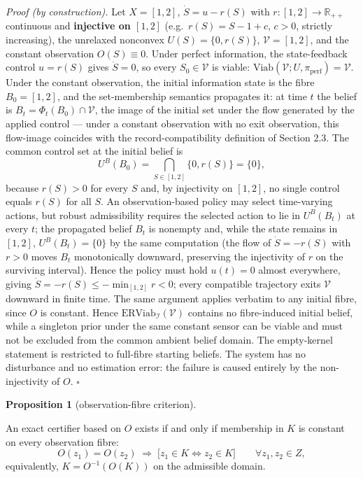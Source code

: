 \documentclass[11pt]{article}
\theoremstyle{definition}
\newtheorem{proposition}{Proposition}
\begin{document}
\emph{Proof (by construction).} Let \(X = [1,2]\), \(\dot S = u - r(S)\)
with \(r : [1,2] \to \mathbb{R}_{++}\) continuous and \textbf{injective
on \([1,2]\)} (e.g.~\(r(S) = S - 1 + c\), \(c > 0\), strictly
increasing), the unrelaxed nonconvex \(U(S) = \{0, r(S)\}\), \(\mathcal{V} = [1,2]\), and the
constant observation \(O(S) \equiv 0\). Under perfect information, the
state-feedback control \(u = r(S)\) gives \(\dot S = 0\), so every
\(S_0 \in \mathcal{V}\) is viable:
\(\mathrm{Viab}(\mathcal{V}; U, \pi_{\mathrm{perf}}) = \mathcal{V}\).
Under the constant observation, the initial information state is the
fibre \(B_0 = [1,2]\), and the set-membership semantics propagates it:
at time \(t\) the belief is \(B_t = \Phi_t(B_0) \cap \mathcal{V}\), the
image of the initial set under the flow generated by the applied control
--- under a constant observation with no exit observation, this
flow-image coincides with the record-compatibility definition of Section
2.3. The common control set at the initial belief is
\[U^B(B_0) = \bigcap_{S \in [1,2]} \{0, r(S)\} = \{0\},\] because
\(r(S) > 0\) for every \(S\) and, by injectivity on \([1,2]\), no single
control equals \(r(S)\) for all \(S\). An observation-based policy may
select time-varying actions, but robust admissibility requires the
selected action to lie in \(U^B(B_t)\) at every \(t\); the propagated
belief \(B_t\) is nonempty and, while the state remains in \([1,2]\),
\(U^B(B_t) = \{0\}\) by the same computation (the flow of
\(\dot S = -r(S)\) with \(r > 0\) moves \(B_t\) monotonically downward,
preserving the injectivity of \(r\) on the surviving interval). Hence
the policy must hold \(u(t) = 0\) almost everywhere, giving
\(\dot S = -r(S) \le -\min_{[1,2]} r < 0\); every compatible trajectory
exits \(\mathcal{V}\) downward in finite time. The same argument applies
verbatim to any initial fibre, since \(O\) is constant. Hence
\(\mathrm{ERViab}_{\mathcal{I}}(\mathcal{V})\) contains no fibre-induced
initial belief, while a singleton prior under the same constant sensor can be viable and must not be excluded from the common ambient belief domain. The empty-kernel statement is restricted to full-fibre starting beliefs. The system has no disturbance and no estimation error: the
failure is caused entirely by the non-injectivity of \(O\). \ensuremath{\square}

\begin{proposition}[observation-fibre criterion]\label{prop:fibre}

An exact certifier
based on \(O\) exists if and only if membership in \(K\) is constant on
every observation fibre:
\[O(z_1) = O(z_2) \;\Longrightarrow\; \big[ z_1 \in K \iff z_2 \in K \big] \qquad \forall z_1, z_2 \in Z, \tag{5}\]
equivalently, \(K = O^{-1}(O(K))\) on the admissible domain.

\end{proposition}
\end{document}

